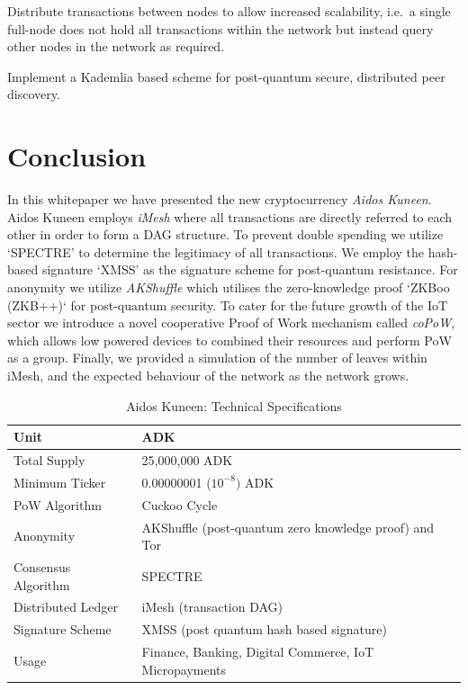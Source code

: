 \documentclass[a4paper,10pt,twocolumn]{article}
\begin{document}
	 Distribute transactions between nodes to allow increased scalability, i.e.\ a single full-node does not hold all transactions within the network but instead query other nodes in the network as required.
		 
	Implement a Kademlia based scheme for post-quantum secure, distributed peer discovery.

	  \section{Conclusion}
\label{sec:conc}

In this whitepaper we have presented the new cryptocurrency \emph{Aidos Kuneen}.
Aidos Kuneen employs \emph{iMesh} where all transactions are directly referred to each other in order to form a DAG structure.
To prevent double spending we utilize `SPECTRE' to determine the legitimacy of all transactions.
We employ the hash-based signature `XMSS' as the signature scheme for post-quantum resistance.
For anonymity we utilize \emph{AKShuffle} which utilises the zero-knowledge proof `ZKBoo (ZKB++)` for post-quantum security.
To cater for the future growth of the IoT sector we introduce a novel cooperative Proof of Work mechanism called \emph{coPoW}, which allows low powered devices to combined their resources and perform PoW as a group.
Finally, we provided a simulation of the number of leaves within iMesh, and the expected behaviour of the network as the network grows.

\begin{table}[htb]
	\caption{Aidos Kuneen: Technical Specifications}
    \label{tbl:spec}
	\begin{tabularx}{\linewidth}{XX} 
		\toprule
		Unit & ADK \\
		\midrule
Total Supply & 25,000,000 ADK \\ 
\midrule
Minimum Ticker & 0.00000001 (\(10^{-8})\) ADK \\ 
\midrule
PoW Algorithm & Cuckoo Cycle\\ 
\midrule
Anonymity & AKShuffle (post-quantum zero knowledge proof) and Tor \\
\midrule
Consensus Algorithm & SPECTRE \\ \midrule
Distributed Ledger & iMesh (transaction DAG) \\
\midrule
Signature Scheme & XMSS (post quantum hash based signature)\\ 
\midrule
Usage &  Finance, Banking, Digital Commerce, IoT Micropayments \\ 
\bottomrule
\end{tabularx}
  \end{table}
\end{document}
